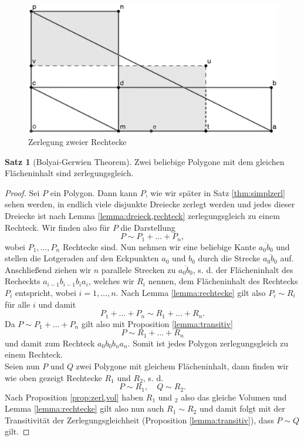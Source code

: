 \documentclass[11pt,titlepage]{article}
\theoremstyle{definition}
\newtheorem{theorem}{Satz}[section]
\theoremstyle{remark}
\begin{document}
	\begin{figure}[!htbp]
		\centering
		\includegraphics[scale=0.8]{Rechteck2}
		\caption{Zerlegung zweier Rechtecke}
		\label{Abb.3}
	\end{figure}
	
	\begin{theorem}[Bolyai-Gerwien Theorem] \label{theorem:bolyai-gerwien}
		Zwei beliebige Polygone mit dem gleichen Flächeninhalt sind zerlegungsgleich.
	\end{theorem}
	
	\begin{proof}
		Sei $P$ ein Polygon. Dann kann $P$, wie wir später in Satz \ref{thm:simplzerl} sehen werden, in endlich viele disjunkte Dreiecke zerlegt werden und jedes dieser 
		Dreiecke ist nach Lemma \ref{lemma:dreieck,rechteck} zerlegungsgleich zu einem Rechteck. Wir finden 
		also für $P$ die Darstellung
		\[ P\sim P_1+\ldots+P_n,\]
		wobei $P_1,\ldots,P_n$ Rechtecke sind. Nun nehmen wir eine beliebige Kante $\overline{a_0b_0}$ und 
		stellen die Lotgeraden auf den Eckpunkten $a_0$ und $b_0$ durch die Strecke $\overline{a_0b_0}$ 
		auf. Anschließend ziehen wir $n$ 
		parallele Strecken zu $\overline{a_0b_0}$, s. d. der Flächeninhalt des Recheckts $a_{i-1}b_{i-1}b_ia_i$, 
		welches wir $R_i$ nennen, dem Flächeninhalt des Rechtecks $P_i$ entspricht, wobei $i=1,\ldots,n$. 
		Nach Lemma \ref{lemma:rechtecke} gilt also $P_i\sim R_i$ für alle $i$ und damit
		\[ P_1+\ldots+P_n\sim R_1+\ldots+R_n. \]
		Da $P\sim P_1+\ldots+P_n$ gilt also mit Proposition \ref{lemma:transitiv}
		\[ P\sim R_1+\ldots+R_n\]
		und damit zum Rechteck $a_0b_0b_na_n$. Somit ist jedes Polygon zerlegungsgleich zu einem Rechteck. \\
		Seien nun $P$ und $Q$ zwei Polygone mit gleichem Flächeninhalt, dann finden wir wie oben gezeigt 
		Rechtecke $R_1$ und $R_2$, s. d.
		\[ P\sim R_1,\quad Q\sim R_2.\]
		Nach Proposition \ref{prop:zerl,vol} haben $R_1$ und $_2$ also das 
		gleiche Volumen und Lemma \ref{lemma:rechtecke} gilt also nun auch 
		$R_1\sim R_2$ und damit folgt mit der Transitivität 
		der Zerlegungsgleichheit 
		(Proposition \ref{lemma:transitiv}), dass $P\sim Q$ gilt.
	\end{proof}
	
\end{document}
